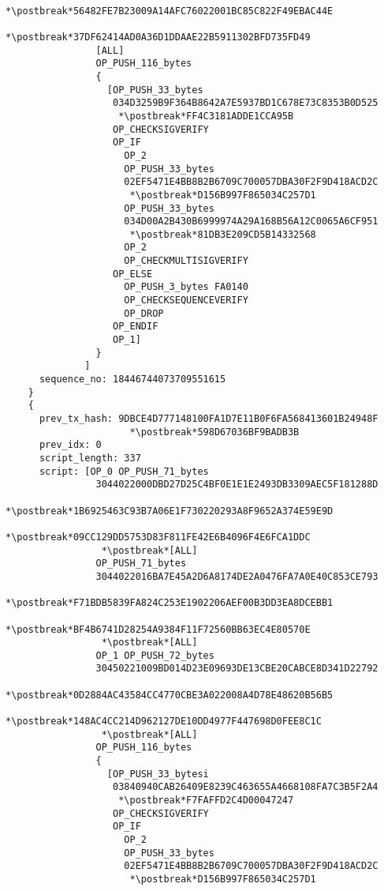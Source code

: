 \begin{lstlisting}
                 *\postbreak*56482FE7B23009A14AFC76022001BC85C822F49EBAC44E
                 *\postbreak*37DF62414AD0A36D1DDAAE22B5911302BFD735FD49
                [ALL]
                OP_PUSH_116_bytes
                {
                  [OP_PUSH_33_bytes
                   034D3259B9F364B8642A7E5937BD1C678E73C8353B0D525
                    *\postbreak*FF4C3181ADDE1CCA95B
                   OP_CHECKSIGVERIFY
                   OP_IF
                     OP_2
                     OP_PUSH_33_bytes
                     02EF5471E4BB8B2B6709C700057DBA30F2F9D418ACD2C
                      *\postbreak*D156B997F865034C257D1
                     OP_PUSH_33_bytes
                     034D00A2B430B6999974A29A168B56A12C0065A6CF951
                      *\postbreak*81DB3E209CD5B14332568
                     OP_2
                     OP_CHECKMULTISIGVERIFY
                   OP_ELSE
                     OP_PUSH_3_bytes FA0140
                     OP_CHECKSEQUENCEVERIFY
                     OP_DROP
                   OP_ENDIF
                   OP_1]
                }
              ]
      sequence_no: 18446744073709551615
    }
    {
      prev_tx_hash: 9DBCE4D777148100FA1D7E11B0F6FA568413601B24948F
                      *\postbreak*598D67036BF9BADB3B
      prev_idx: 0
      script_length: 337
      script: [OP_0 OP_PUSH_71_bytes
                3044022000DBD27D25C4BF0E1E1E2493DB3309AEC5F181288D
                 *\postbreak*1B6925463C93B7A06E1F730220293A8F9652A374E59E9D
                 *\postbreak*09CC129DD5753D83F811FE42E6B4096F4E6FCA1DDC
                 *\postbreak*[ALL]
                OP_PUSH_71_bytes
                3044022016BA7E45A2D6A8174DE2A0476FA7A0E40C853CE793
                 *\postbreak*F71BDB5839FA824C253E1902206AEF00B3DD3EA8DCEBB1
                 *\postbreak*BF4B6741D28254A9384F11F72560BB63EC4E80570E
                 *\postbreak*[ALL]
                OP_1 OP_PUSH_72_bytes
                30450221009BD014D23E09693DE13CBE20CABCE8D341D22792
                 *\postbreak*0D2884AC43584CC4770CBE3A022008A4D78E48620B56B5
                 *\postbreak*148AC4CC214D962127DE10DD4977F447698D0FEE8C1C
                 *\postbreak*[ALL]
                OP_PUSH_116_bytes
                {
                  [OP_PUSH_33_bytesi
                   03840940CAB26409E8239C463655A4668108FA7C3B5F2A4
                    *\postbreak*F7FAFFD2C4D00047247
                   OP_CHECKSIGVERIFY
                   OP_IF
                     OP_2
                     OP_PUSH_33_bytes
                     02EF5471E4BB8B2B6709C700057DBA30F2F9D418ACD2C
                      *\postbreak*D156B997F865034C257D1

\end{lstlisting}
